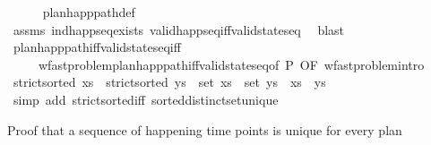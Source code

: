 \begin{isabellebody}
%
\isadelimproof
\ \ \ \ %
\endisadelimproof
%
\isatagproof
{}\isamarkupfalse%
\ plan{\isacharunderscore}{\kern0pt}happ{\isacharunderscore}{\kern0pt}path{\isacharunderscore}{\kern0pt}def\isanewline
\ \ \ \ \isamarkupfalse%
\ assms\ ind{\isacharunderscore}{\kern0pt}happ{\isacharunderscore}{\kern0pt}seq{\isacharunderscore}{\kern0pt}exists\ valid{\isacharunderscore}{\kern0pt}happ{\isacharunderscore}{\kern0pt}seq{\isacharunderscore}{\kern0pt}iff{\isacharunderscore}{\kern0pt}valid{\isacharunderscore}{\kern0pt}state{\isacharunderscore}{\kern0pt}seq\ \isamarkupfalse%
\ blast%
\endisatagproof
{\isafoldproof}%
%
\isadelimproof
\isanewline
%
\endisadelimproof
\isanewline
\ \ \isamarkupfalse%
\ plan{\isacharunderscore}{\kern0pt}happ{\isacharunderscore}{\kern0pt}path{\isacharunderscore}{\kern0pt}iff{\isacharunderscore}{\kern0pt}valid{\isacharunderscore}{\kern0pt}state{\isacharunderscore}{\kern0pt}seq{\isacharunderscore}{\kern0pt}iff{\isacharprime}{\kern0pt}\isanewline
\ \ \ \ {\isacharequal}{\kern0pt}\ wf{\isacharunderscore}{\kern0pt}ast{\isacharunderscore}{\kern0pt}problem{\isachardot}{\kern0pt}plan{\isacharunderscore}{\kern0pt}happ{\isacharunderscore}{\kern0pt}path{\isacharunderscore}{\kern0pt}iff{\isacharunderscore}{\kern0pt}valid{\isacharunderscore}{\kern0pt}state{\isacharunderscore}{\kern0pt}seq{\isacharbrackleft}{\kern0pt}of\ P{\isacharcomma}{\kern0pt}\ OF\ wf{\isacharunderscore}{\kern0pt}ast{\isacharunderscore}{\kern0pt}problem{\isachardot}{\kern0pt}intro{\isacharbrackright}{\kern0pt}\isanewline
\isanewline
\ \ \isamarkupfalse%
\ {\isachardoublequoteopen}strict{\isacharunderscore}{\kern0pt}sorted\ xs\ {\isasymLongrightarrow}\ strict{\isacharunderscore}{\kern0pt}sorted\ ys\ {\isasymLongrightarrow}\ set\ xs\ {\isacharequal}{\kern0pt}\ set\ ys\ {\isasymLongrightarrow}\ xs\ {\isacharequal}{\kern0pt}\ ys{\isachardoublequoteclose}\isanewline
%
\isadelimproof
\ \ \ \ %
\endisadelimproof
%
\isatagproof
{}\isamarkupfalse%
\ {\isacharparenleft}{\kern0pt}simp\ add{\isacharcolon}{\kern0pt}\ strict{\isacharunderscore}{\kern0pt}sorted{\isacharunderscore}{\kern0pt}iff\ sorted{\isacharunderscore}{\kern0pt}distinct{\isacharunderscore}{\kern0pt}set{\isacharunderscore}{\kern0pt}unique{\isacharparenright}{\kern0pt}%
\endisatagproof
{\isafoldproof}%
%
\isadelimproof
%
\endisadelimproof
%
\begin{isamarkuptext}%
Proof that a sequence of happening time points is unique for every plan%
\end{isamarkuptext}\isamarkuptrue%

\end{isabellebody}
